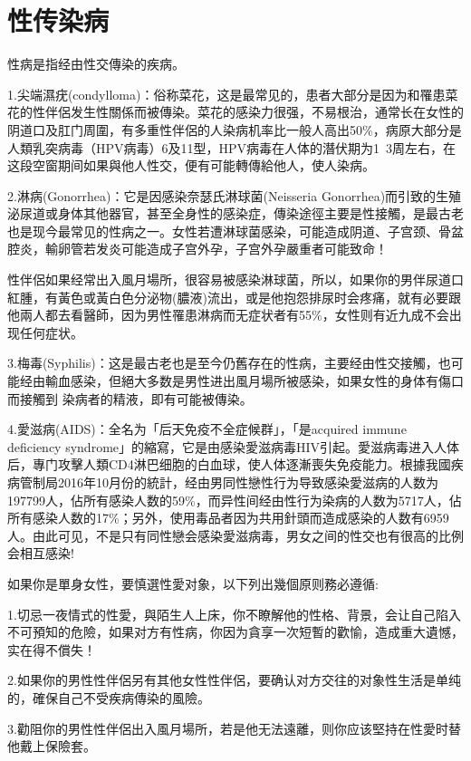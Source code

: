\documentclass[12pt,UTF8]{ctexbook}
\begin{document}
\part{性传染病}

性病是指经由性交傳染的疾病。

1.尖端濕疣(condylloma)：俗称菜花，这是最常见的，患者大部分是因为和罹患菜花的性伴侶发生性關係而被傳染。菜花的感染力很强，不易根治，通常长在女性的阴道口及肛门周圍，有多重性伴侶的人染病机率比一般人高出50\%，病原大部分是人類乳突病毒（HPV病毒）6及11型，HPV病毒在人体的潛伏期为1~3周左右，在这段空窗期间如果與他人性交，便有可能轉傳給他人，使人染病。

2.淋病(Gonorrhea)：它是因感染奈瑟氏淋球菌(Neisseria Gonorrhea)而引致的生殖泌尿道或身体其他器官，甚至全身性的感染症，傳染途徑主要是性接觸，是最古老也是现今最常见的性病之一。女性若遭淋球菌感染，可能造成阴道、子宫颈、骨盆腔炎，輸卵管若发炎可能造成子宫外孕，子宫外孕嚴重者可能致命！

性伴侶如果经常出入風月場所，很容易被感染淋球菌，所以，如果你的男伴尿道口紅腫，有黃色或黃白色分泌物(膿液)流出，或是他抱怨排尿时会疼痛，就有必要跟他兩人都去看醫師，因为男性罹患淋病而无症状者有55\%，女性则有近九成不会出现任何症状。

3.梅毒(Syphilis)：这是最古老也是至今仍舊存在的性病，主要经由性交接觸，也可能经由輸血感染，但絕大多数是男性进出風月場所被感染，如果女性的身体有傷口而接觸到
染病者的精液，即有可能被傳染。

4.愛滋病(AIDS)：全名为「后天免疫不全症候群」，「是acquired immune deficiency syndrome」的縮寫，它是由感染愛滋病毒HIV引起。愛滋病毒进入人体后，專门攻擊人類CD4淋巴细胞的白血球，使人体逐漸喪失免疫能力。根據我國疾病管制局2016年10月份的統計，经由男同性戀性行为导致感染愛滋病的人数为197799人，佔所有感染人数的59\%，而异性间经由性行为染病的人数为5717人，佔所有感染人数的17\%；另外，使用毒品者因为共用針頭而造成感染的人数有6959人。由此可见，不是只有同性戀会感染愛滋病毒，男女之间的性交也有很高的比例会相互感染!

如果你是單身女性，要慎選性愛对象，以下列出幾個原则務必遵循:

1.切忌一夜情式的性愛，與陌生人上床，你不瞭解他的性格、背景，会让自己陷入不可預知的危險，如果对方有性病，你因为貪享一次短暫的歡愉，造成重大遺憾，实在得不償失！

2.如果你的男性性伴侶另有其他女性性伴侶，要确认对方交往的对象性生活是单纯的，確保自己不受疾病傳染的風險。

3.勸阻你的男性性伴侶出入風月場所，若是他无法遠離，则你应该堅持在性愛时替他戴上保險套。
\end{document}
